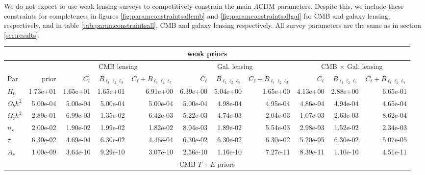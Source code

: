 \documentclass[11pt]{article} %
\begin{document}
We do not expect to use weak lensing surveys to competitively constrain the main $\Lambda$CDM parameters. Despite this, we include these constraints for completeness in figures \ref{fig:paramconstraintsallcmb} and \ref{fig:paramconstraintsallgal} for CMB and galaxy lensing, respectively, and in table \ref{tab:paramconstraintsall}. CMB and galaxy lensing respectively. All survey parameters are the same as in section \ref{sec:results}.
\begin{table}[h!]
    \centering
    \tiny
    \begin{tabular}{|l|r|rrr|rrr|rrr|}
        \hline
        \multicolumn{11}{|c|}{weak priors} \\
        \hline
        && \multicolumn{3}{c|}{CMB lensing}& \multicolumn{3}{c|}{Gal. lensing}& \multicolumn{3}{c|}{CMB $\times$ Gal. lensing} \\
        \hline
        Par            &   prior &   $C_\ell$ &   $B_{\ell_1\ell_2\ell_3}$ &   $C_\ell + B_{\ell_1\ell_2\ell_3}$ &   $C_\ell$ &   $B_{\ell_1\ell_2\ell_3}$ &   $C_\ell + B_{\ell_1\ell_2\ell_3}$ &   $C_\ell$ &   $B_{\ell_1\ell_2\ell_3}$ &   $C_\ell + B_{\ell_1\ell_2\ell_3}$ \\
        \hline
        $H_0$          &     1.73e+01 &  1.65e+01 &  1.65e+01 &        6.91e+00 & 6.39e+00 & 5.04e+00 &      1.65e+00 &      4.13e+00 &      2.88e+00 &             6.65e-01 \\
        $\Omega_b h^2$ &     5.00e-04 &  5.00e-04 &  5.00e-04 &        5.00e-04 & 5.00e-04 & 4.98e-04 &      4.95e-04 &      4.86e-04 &      4.94e-04 &             4.65e-04 \\
        $\Omega_c h^2$ &     2.89e-01 &  6.99e-03 &  1.35e-02 &        6.42e-03 & 5.22e-03 & 4.74e-03 &      2.04e-03 &      1.07e-03 &      2.63e-03 &             8.62e-04 \\
        $n_s$          &     2.00e-02 &  1.90e-02 &  1.99e-02 &        1.82e-02 & 8.04e-03 & 1.89e-02 &      5.54e-03 &      2.98e-03 &      1.52e-02 &             2.34e-03 \\
        $\tau$         &     6.30e-02 &  4.69e-04 &  6.30e-02 &        4.46e-04 & 6.30e-02 & 6.30e-02 &      6.30e-02 &      5.20e-05 &      6.30e-02 &             5.07e-05 \\
        $A_s$          &     1.00e-09 &  3.64e-10 &  9.29e-10 &        3.07e-10 & 2.56e-10 & 1.16e-10 &      7.27e-11 &      8.39e-11 &      1.10e-10 &             4.51e-11 \\
        \hline
        \multicolumn{11}{|c|}{CMB $T + E$ priors} \\

\end{tabular}
\end{table}
\end{document}
